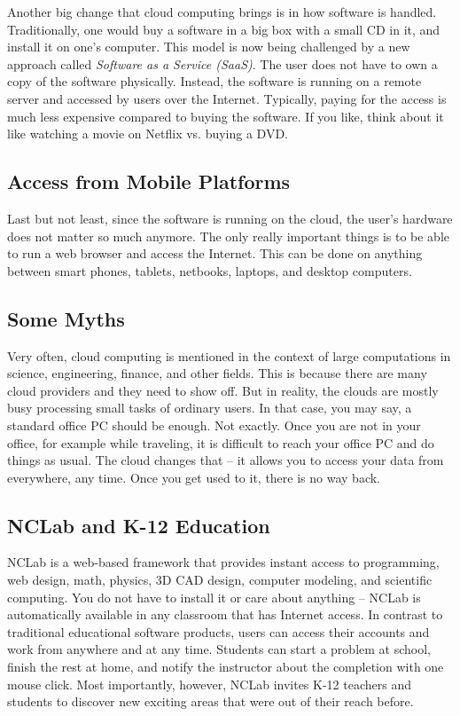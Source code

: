 \documentclass[article,A4,12pt]{llncs}
\begin{document}
Another big change that cloud computing brings is in how software is handled. 
Traditionally, one would buy a software in a big box with a small CD in it, 
and install it on one's computer. This model is now being challenged by a new 
approach called {\em Software as a Service (SaaS)}. The user does not have 
to own a copy of the software physically. Instead, the software is running 
on a remote server and accessed by users over the Internet. Typically, paying 
for the access is much less expensive compared to buying the software. If you like,
think about it like watching a movie on Netflix vs. buying a DVD. 

\subsection{Access from Mobile Platforms}

Last but not least, since the software is running on the cloud, the user's hardware 
does not matter so much anymore. The only really important things is to be able to 
run a web browser and access the Internet. This can be done on anything between smart 
phones, tablets, netbooks, laptops, and desktop computers. 

\subsection{Some Myths}

Very often, cloud computing is mentioned in the context of large 
computations in science, engineering, finance, and other fields. This is because there are many 
cloud providers and they need to show off. But in reality, the clouds are mostly
busy processing small tasks of ordinary users. In that case, you may say, a standard 
office PC should be enough. Not exactly. Once you are not in your office, for example
while traveling, it is difficult to reach your office PC and do things as usual. 
The cloud changes that -- it allows you to access your data 
from everywhere, any time. Once you get used to it, there is no way back. 

\subsection{NCLab and K-12 Education}

NCLab is a web-based framework that provides 
instant access to programming, web design, math, physics, 3D CAD design, computer
modeling, and scientific computing. You do not have to install it or care about 
anything -- NCLab 
is automatically available in any classroom that has Internet access. In 
contrast to traditional educational software products, 
users can access their accounts and work from anywhere and at any time.
Students can start a problem at school, finish the rest at home, and notify 
the instructor about the completion with one mouse click. Most importantly, 
however, NCLab invites K-12 teachers and students to discover new exciting 
areas that were out of their reach before.
\end{document}
